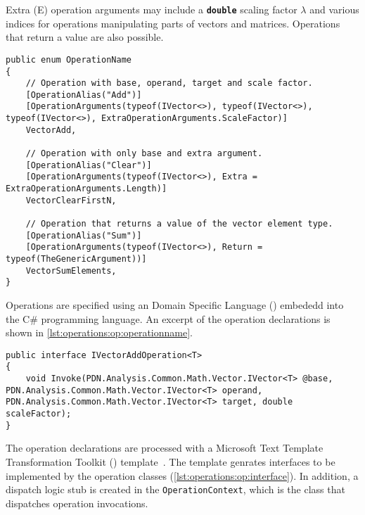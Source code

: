 Extra (E) operation arguments may include a \texttt{\textbf{double}}
scaling factor $\lambda$ and various indices for operations
manipulating parts of vectors and matrices. Operations that return a
value are also possible.

\begin{lstlisting}[float,caption={\textls{DSL} for operation
    declarations (excerpt).},label=lst:operations:op:operationname]
public enum OperationName
{
    // Operation with base, operand, target and scale factor.
    [OperationAlias("Add")]
    [OperationArguments(typeof(IVector<>), typeof(IVector<>), typeof(IVector<>), ExtraOperationArguments.ScaleFactor)]
    VectorAdd,

    // Operation with only base and extra argument.
    [OperationAlias("Clear")]
    [OperationArguments(typeof(IVector<>), Extra = ExtraOperationArguments.Length)]
    VectorClearFirstN,

    // Operation that returns a value of the vector element type.
    [OperationAlias("Sum")]
    [OperationArguments(typeof(IVector<>), Return = typeof(TheGenericArgument))]
    VectorSumElements,
}
\end{lstlisting}

Operations are specified using an Domain Specific Language
() embededd into the C\# programming language. An excerpt
of the operation declarations is shown in
\cref{lst:operations:op:operationname}.

\begin{lstlisting}[float,caption={An example interface generated by
    the \texttt{T4} template.},label=lst:operations:op:interface]
public interface IVectorAddOperation<T>
{
    void Invoke(PDN.Analysis.Common.Math.Vector.IVector<T> @base, PDN.Analysis.Common.Math.Vector.IVector<T> operand, PDN.Analysis.Common.Math.Vector.IVector<T> target, double scaleFactor);
}
\end{lstlisting}

The operation declarations are processed with a Microsoft Text
Template Transformation Toolkit () template~\citep{T4}. The
template genrates interfaces to be implemented by the operation
classes (\cref{lst:operations:op:interface}). In addition, a dispatch
logic stub is created in the \texttt{OperationContext}, which is the
class that dispatches operation invocations.


